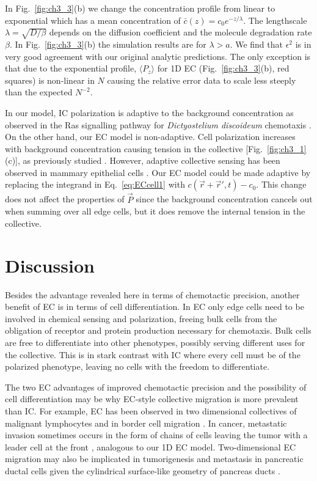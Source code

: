 In Fig.\ \ref{fig:ch3_3}(b) we change the concentration profile from linear to exponential which has a mean concentration of
$\bar{c}(z) = c_0 e^{-z/\lambda}$.
The lengthscale $\lambda=\sqrt{D/\beta}$ depends on the diffusion coefficient and the molecule degradation rate $\beta$. In Fig.\ \ref{fig:ch3_3}(b) the simulation results are for $\lambda > a$. We find that $\epsilon^2$ is in very good agreement with our original analytic predictions. The only exception is that due to the exponential profile, $\langle P_z \rangle$ for 1D EC (Fig.\ \ref{fig:ch3_3}(b), red squares) is non-linear in $N$ causing the relative error data to scale less steeply than the expected $N^{-2}$.

In our model, IC polarization is adaptive to the background concentration as observed in the Ras signalling pathway for \textit{Dictyostelium discoideum} chemotaxis \cite{takeda2012incoherent}. On the other hand, our EC model is non-adaptive. Cell polarization increases with background concentration causing tension in the collective [Fig.\ \ref{fig:ch3_1}(c)], as previously studied \cite{camley2016emergent}. However, adaptive collective sensing has been observed in mammary epithelial cells \cite{ellison2016cell}. Our EC model could be made adaptive by replacing the integrand in Eq.\ \ref{eq:ECcell1} with
$c(\vec{r}+\vec{r}',t)-c_0$.
This change does not affect the properties of $\vec{P}$ since the background concentration cancels out when summing over all edge cells, but it does remove the internal tension in the collective.

\section{Discussion}

Besides the advantage revealed here in terms of chemotactic precision, another benefit of EC is in terms of cell differentiation. In EC only edge cells need to be involved in chemical sensing and polarization, freeing bulk cells from the obligation of receptor and protein production necessary for chemotaxis. Bulk cells are free to differentiate into other phenotypes, possibly serving different uses for the collective. This is in stark contrast with IC where every cell must be of the polarized phenotype, leaving no cells with the freedom to differentiate.

The two EC advantages of improved chemotactic precision and the possibility of cell differentiation may be why EC-style collective migration is more prevalent than IC. For example, EC has been observed in two dimensional collectives of malignant lymphocytes \cite{malet2015collective} and in border cell migration \cite{cai2016modeling}. In cancer, metastatic invasion sometimes occurs in the form of chains of cells leaving the tumor with a leader cell at the front \cite{cheung2013collective,friedl2009collective}, analogous to our 1D EC model. Two-dimensional EC migration may also be implicated in tumorigenesis and metastasis in pancreatic ductal cells given the cylindrical surface-like geometry of pancreas ducts
\cite{bardeesy2002pancreatic}.

